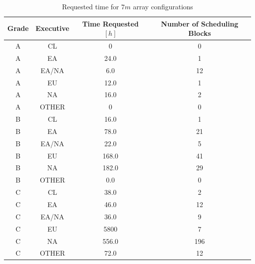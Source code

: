 \begin{table}
\begin{center}
\begin{tabular}{|c|c|c|c|}
\hline
Grade & Executive & Time Requested $[h]$ & Number of Scheduling Blocks \\ \hline
A &	CL		& 0  & 0 \\ \hline
A &	EA		& 24.0  & 1 \\ \hline
A &	EA/NA	& 6.0   & 12 \\ \hline
A & EU      & 12.0 & 1 \\ \hline 
A &	NA		& 16.0 & 2 \\ \hline
A & OTHER	& 0		& 0 \\ \hline
B  & CL 	& 16.0		& 1  \\ \hline
B  & EA     & 78.0     & 21 \\ \hline
B  & EA/NA  & 22.0     & 5  \\ \hline
B  & EU     & 168.0     & 41 \\ \hline
B  & NA     & 182.0    & 29 \\ \hline
B  & OTHER  & 0.0      & 0  \\ \hline
C  & CL     & 38.0     & 2  \\ \hline
C  & EA     & 46.0     & 12  \\ \hline
C  & EA/NA  & 36.0      & 9  \\ \hline
C  & EU     & 5800     & 7 \\ \hline
C  & NA     & 556.0     & 196 \\ \hline
C  & OTHER  & 72.0      & 12  \\ \hline
\end{tabular}
\end{center}
\caption{Requested time for $7m$ array configurations}
\label{table:requested-time-7m}
\end{table}

